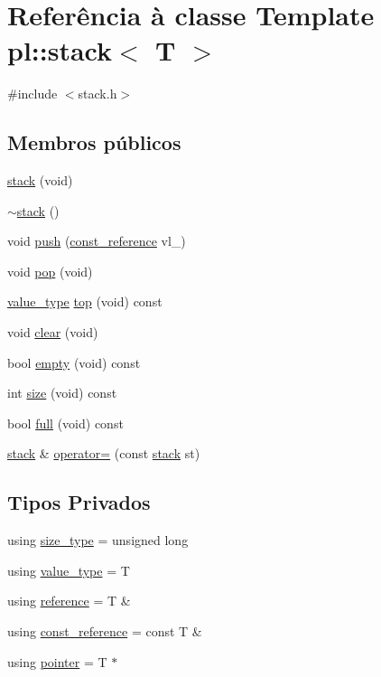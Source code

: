 \hypertarget{classpl_1_1stack}{}\section{Referência à classe Template pl\+:\+:stack$<$ T $>$}
\label{classpl_1_1stack}


{\ttfamily \#include $<$stack.\+h$>$}

\subsection*{Membros públicos}
\begin{DoxyCompactItemize}
\item 
\hyperlink{classpl_1_1stack_a80f544bbc443e2cedfaa1c5a46376035}{stack} (void)
\item 
\hyperlink{classpl_1_1stack_acc3e2e498b934dfed18fa60440373960}{$\sim$stack} ()
\item 
void \hyperlink{classpl_1_1stack_ab4c99a438c4dd0da57c162da9d08d184}{push} (\hyperlink{classpl_1_1stack_a9474b23cf6fa5332f22fc06852e2d6d5}{const\+\_\+reference} vl\+\_\+)
\item 
void \hyperlink{classpl_1_1stack_aee95f572e71eeebc97a4d5543d500886}{pop} (void)
\item 
\hyperlink{classpl_1_1stack_a2297d235c54cb53f6b8c4be2a324deee}{value\+\_\+type} \hyperlink{classpl_1_1stack_a3761155a1aeea83b706ae04d416c3608}{top} (void) const
\item 
void \hyperlink{classpl_1_1stack_a97f9f75d2c40c2c68770dde9b4c42254}{clear} (void)
\item 
bool \hyperlink{classpl_1_1stack_aca2e0457107fc5dedd3f70965f70cb91}{empty} (void) const
\item 
int \hyperlink{classpl_1_1stack_a51d32715600434c7e979c271d298b63c}{size} (void) const
\item 
bool \hyperlink{classpl_1_1stack_a079fc472e272b4ae05c9b9a360c919bc}{full} (void) const
\item 
\hyperlink{classpl_1_1stack}{stack} \& \hyperlink{classpl_1_1stack_a9b42f29bf5355bbf95868a16cbacb6a0}{operator=} (const \hyperlink{classpl_1_1stack}{stack} st)
\end{DoxyCompactItemize}
\subsection*{Tipos Privados}
\begin{DoxyCompactItemize}
\item 
using \hyperlink{classpl_1_1stack_a062294c02a6a02f174a30e98e54ff880}{size\+\_\+type} = unsigned long
\item 
using \hyperlink{classpl_1_1stack_a2297d235c54cb53f6b8c4be2a324deee}{value\+\_\+type} = T
\item 
using \hyperlink{classpl_1_1stack_a15ed30ec492b3112ec530d239670ee1b}{reference} = T \&
\item 
using \hyperlink{classpl_1_1stack_a9474b23cf6fa5332f22fc06852e2d6d5}{const\+\_\+reference} = const T \&
\item 
using \hyperlink{classpl_1_1stack_a3713c8d6cb6cc72c07a445b11c39ae43}{pointer} = T $\ast$
\end{DoxyCompactItemize}
